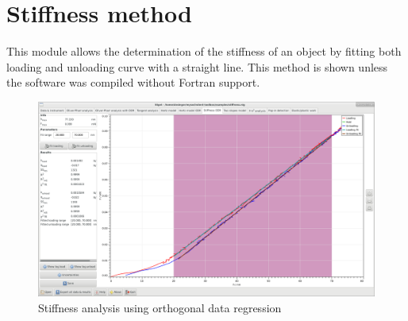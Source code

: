 \section{Stiffness method}
This module allows the determination of the stiffness of an object by fitting both loading and unloading curve with a straight line. 
This method is shown unless the software was compiled without Fortran support.  \\

\begin{figure}[ht]
  \centering
  \includegraphics[width=\textwidth]{images/screen-stiffness}
  \caption{Stiffness analysis using orthogonal data regression}
\end{figure}

